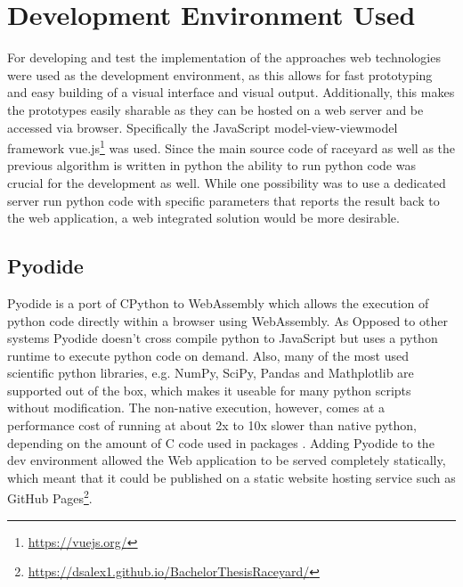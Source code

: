 \section{Development Environment Used}
For developing and test the implementation of the approaches web technologies were used as the development environment, as this allows for fast prototyping and easy building of a visual interface and visual output. Additionally, this makes the prototypes easily sharable as they can be hosted on a web server and be accessed via browser. Specifically the JavaScript model-view-viewmodel framework vue.js\footnote{\url{https://vuejs.org/}} was used. Since the main source code of raceyard as well as the previous algorithm is written in python the ability to run python code was crucial for the development as well. While one possibility was to use a dedicated server run python code with specific parameters that reports the result back to the web application, a web integrated solution would be more desirable.

\subsection{Pyodide}
Pyodide is a port of CPython to WebAssembly \cite{pyodide} which allows the execution of python code directly within a browser using WebAssembly. As Opposed to other systems Pyodide doesn't cross compile python to JavaScript but uses a python runtime to execute python code on demand. Also, many of the most used scientific python libraries, e.g. NumPy, SciPy, Pandas and Mathplotlib are supported out of the box, which makes it useable for many python scripts without modification. The non-native execution, however, comes at a performance cost of running at about 2x to 10x slower than native python, depending on the amount of C code used in packages \cite{pyodide2021}\cite{Jangda2019}. Adding Pyodide to the dev environment allowed the Web application to be served completely statically, which meant that it could be published on a static website hosting service such as GitHub Pages\footnote{\url{https://dsalex1.github.io/BachelorThesisRaceyard/}}.